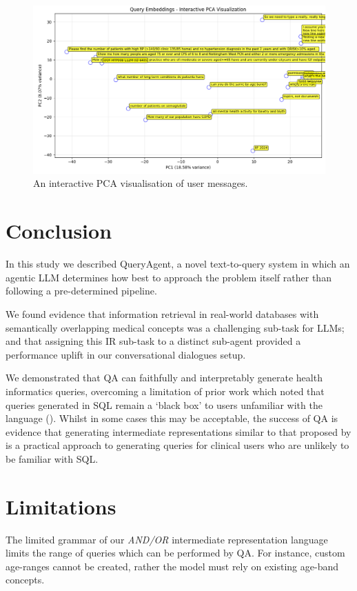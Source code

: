 \documentclass[11pt]{article}
\begin{document}
\begin{figure}[b]
  \includegraphics[width=\linewidth]{content/pca_09_16_randomly_sampled_20.png}
  \caption{
    An interactive PCA visualisation of user messages.
  }
  \label{fig:sample-user-utterances}
\end{figure}

\section{Conclusion}
In this study we described QueryAgent, a novel text-to-query system in which an agentic LLM determines how best to approach the problem itself rather than following a pre-determined pipeline.

We found evidence that information retrieval in real-world databases with semantically overlapping medical concepts was a challenging sub-task for LLMs; and that assigning this IR sub-task to a distinct sub-agent provided a performance uplift in our conversational dialogues setup.

We demonstrated that QA can faithfully and interpretably generate health informatics queries, overcoming a limitation of prior work which noted that queries generated in SQL remain a `black box' to users unfamiliar with the language  (\citet{ziletti_generating_2025}).
Whilst in some cases this may be acceptable, the success of QA is evidence that generating intermediate representations similar to that proposed by \citet{guo_towards_2019} is a practical approach to generating queries for clinical users who are unlikely to be familiar with SQL.


\section{Limitations}
The limited grammar of our \textit{AND/OR} intermediate representation language limits the range of queries which can be performed by QA.
For instance, custom age-ranges cannot be created, rather the model must rely on existing age-band concepts.
\end{document}
